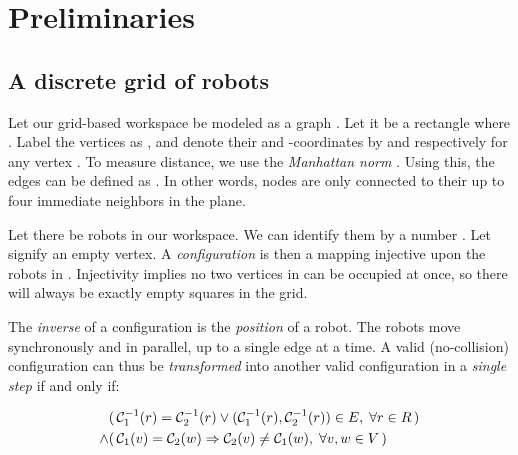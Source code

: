 \section{Preliminaries}

\subsection{A discrete grid of robots}

Let our grid-based workspace be modeled as a graph . Let it be a rectangle  where . Label the vertices as , and denote their  and  -coordinates by  and  respectively for any vertex . To measure distance, we use the \emph{Manhattan norm} . Using this, the edges can be defined as . In other words, nodes are only connected to their up to four immediate neighbors in the plane.

Let there be  robots in our workspace. We can identify them by a number . Let \ilmath{\bot} signify an empty vertex. A \emph{configuration} is then a mapping  injective upon the robots in . Injectivity implies no two vertices in  can be occupied at once, so there will always be exactly  empty squares in the grid.

The \emph{inverse} of a configuration  is the \emph{position} of a robot. The robots move synchronously and in parallel, up to a single edge at a time. A valid (no-collision) configuration  can thus be \emph{transformed} into another valid configuration  in a \emph{single step} if and only if:

\begin{align}
	& (\, \mathcal{C}_{1}^{-1}(r) = \mathcal{C}_{2}^{-1}(r) \lor (\mathcal{C}_{1}^{-1}(r), \mathcal{C}_{2}^{-1}(r)) \in E, \; \forall r \in R \,)\label{req:limited_movement}\\
	\land & (\, \mathcal{C}_{1}(v) = \mathcal{C}_{2}(w) \Rightarrow \mathcal{C}_{2}(v) \neq \mathcal{C}_{1}(w), \; \forall v, w \in V \,)\label{req:no_swaps}
\end{align}

